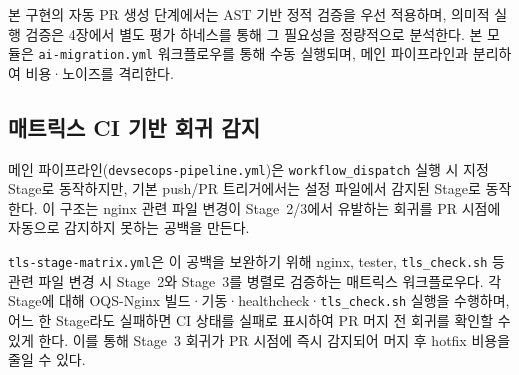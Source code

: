 본 구현의 자동 PR 생성 단계에서는 AST 기반 정적 검증을 우선 적용하며, 의미적 실행 검증은 4장에서 별도 평가 하네스를 통해 그 필요성을 정량적으로 분석한다.
본 모듈은 \texttt{ai-migration.yml} 워크플로우를 통해 수동 실행되며, 메인 파이프라인과 분리하여 비용·노이즈를 격리한다.

\subsection{매트릭스 CI 기반 회귀 감지}

메인 파이프라인(\texttt{devsecops-pipeline.yml})은 \texttt{workflow\_dispatch} 실행 시 지정 Stage로 동작하지만, 기본 push/PR 트리거에서는 설정 파일에서 감지된 Stage로 동작한다.
이 구조는 nginx 관련 파일 변경이 Stage~2/3에서 유발하는 회귀를 PR 시점에 자동으로 감지하지 못하는 공백을 만든다.

\texttt{tls-stage-matrix.yml}은 이 공백을 보완하기 위해 nginx, tester, \texttt{tls\_check.sh} 등 관련 파일 변경 시 Stage~2와 Stage~3를 병렬로 검증하는 매트릭스 워크플로우다.
각 Stage에 대해 OQS-Nginx 빌드·기동·healthcheck·\texttt{tls\_check.sh} 실행을 수행하며, 어느 한 Stage라도 실패하면 CI 상태를 실패로 표시하여 PR 머지 전 회귀를 확인할 수 있게 한다.
이를 통해 Stage~3 회귀가 PR 시점에 즉시 감지되어 머지 후 hotfix 비용을 줄일 수 있다.